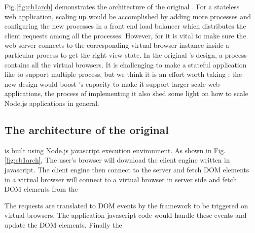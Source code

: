 
Fig.\ref{fig:cb1arch} demonstrates the architecture of the original \cb{}.
For a stateless web application,
scaling up would be accomplished by adding more processes and configuring the new processes
in a front end load balancer which distributes the client requests among all the processes.
However, for \cb{} it is vital to make sure the web server connects to the corresponding
virtual browser instance inside a particular process to get the right view state.
In the original \cb{}'s design, a \cb{} process contains all the virtual browsers.%
It is challenging to make a stateful application like \cb{} to support multiple process, 
but we think it is an effort worth taking :
the new design would boost \cb{}'s capacity to make it support larger scale web applications,
the process of implementing it also shed some light on how to scale Node.js applications in general.

\subsection{The architecture of the original \cb{}}
\cb{} is built using Node.js javascript execution environment. %
As shown in Fig.\ref{fig:cb1arch}, 
The user's browser will download the client engine written in javascript.
The client engine then connect to the server and fetch DOM elements in a
virtual browser
will connect to a virtual browser in server side and fetch DOM
elements from the 

The requests are translated to DOM events by the framework to be triggered on virtual browsers.
The application javascript code would handle these events and update the DOM elements.
Finally the 

\architectureoverview{} 

